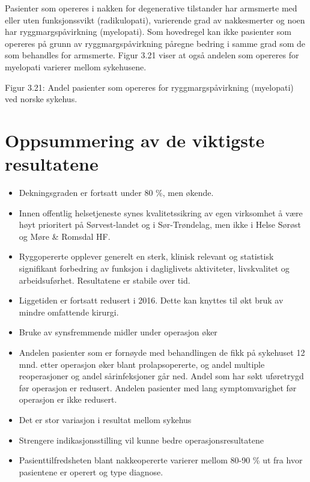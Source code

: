 \documentclass [norsk,a4paper,twoside]{article}\usepackage[]{graphicx}\usepackage[]{color}
\begin{document}
Pasienter som opereres i nakken for degenerative tilstander har armsmerte med
eller uten funksjonssvikt (radikulopati), varierende grad av nakkesmerter og noen
har ryggmargspåvirkning (myelopati). Som hovedregel kan ikke pasienter som
opereres på grunn av ryggmargspåvirkning påregne bedring i samme grad som de
som behandles for armsmerte. Figur 3.21 viser at også andelen som opereres for
myelopati varierer mellom sykehusene.

Figur 3.21: Andel pasienter som opereres for ryggmargspåvirkning (myelopati) ved
norske sykehus.


\section{Oppsummering av de viktigste resultatene}

\begin{itemize}
\item Dekningsgraden er fortsatt under 80 \%, men økende.
\item Innen offentlig helsetjeneste synes kvalitetssikring av egen virksomhet å
være høyt prioritert på Sørvest-landet og i Sør-Trøndelag, men ikke i Helse
Sørøst og Møre & Romsdal HF.
\item Ryggopererte opplever generelt en sterk, klinisk relevant og statistisk
signifikant forbedring av funksjon i dagliglivets aktiviteter, livskvalitet og
arbeidsuførhet. Resultatene er stabile over tid.
\item Liggetiden er fortsatt redusert i 2016. Dette kan knyttes til økt bruk av
mindre omfattende kirurgi.
\item Bruke av synsfremmende midler under operasjon øker
\item Andelen pasienter som er fornøyde med behandlingen de fikk på sykehuset
12 mnd. etter operasjon øker blant prolapsopererte, og andel multiple
reoperasjoner og andel sårinfeksjoner går ned. Andel som har søkt
uføretrygd før operasjon er redusert. Andelen pasienter med lang
symptomvarighet før operasjon er ikke redusert.
\item Det er stor variasjon i resultat mellom sykehus
\item Strengere indikasjonsstilling vil kunne bedre operasjonsresultatene
\item Pasienttilfredsheten blant nakkeopererte varierer mellom 80-90 \% ut fra
hvor pasientene er operert og type diagnose.
\end{itemize}
\end{document}
